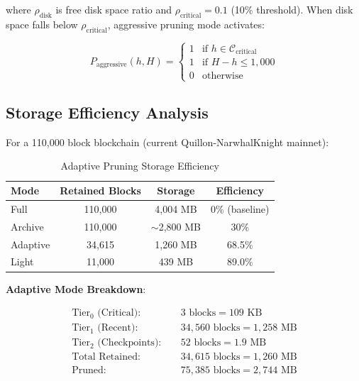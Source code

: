 \documentclass[11pt,a4paper]{article}
\begin{document}
where $\rho_{\text{disk}}$ is free disk space ratio and $\rho_{\text{critical}} = 0.1$ (10\% threshold). When disk space falls below $\rho_{\text{critical}}$, aggressive pruning mode activates:

\begin{equation}
P_{\text{aggressive}}(h, H) = \begin{cases}
1 & \text{if } h \in \mathcal{C}_{\text{critical}} \\
1 & \text{if } H - h \leq 1,000 \\
0 & \text{otherwise}
\end{cases}
\end{equation}

\subsection{Storage Efficiency Analysis}

For a 110,000 block blockchain (current Quillon-NarwhalKnight mainnet):

\begin{table}[H]
\centering
\caption{Adaptive Pruning Storage Efficiency}
\begin{tabular}{|l|c|c|c|}
\hline
\textbf{Mode} & \textbf{Retained Blocks} & \textbf{Storage} & \textbf{Efficiency} \\
\hline
Full & 110,000 & 4,004 MB & 0\% (baseline) \\
Archive & 110,000 & $\sim$2,800 MB & 30\% \\
Adaptive & 34,615 & 1,260 MB & 68.5\% \\
Light & 11,000 & 439 MB & 89.0\% \\
\hline
\end{tabular}
\label{tab:pruning-efficiency}
\end{table}

\textbf{Adaptive Mode Breakdown}:

\begin{align}
\text{Tier}_0 \text{ (Critical)}: & \quad 3 \text{ blocks} = 109 \text{ KB} \\
\text{Tier}_1 \text{ (Recent)}: & \quad 34,560 \text{ blocks} = 1,258 \text{ MB} \\
\text{Tier}_2 \text{ (Checkpoints)}: & \quad 52 \text{ blocks} = 1.9 \text{ MB} \\
\hline
\text{Total Retained}: & \quad 34,615 \text{ blocks} = 1,260 \text{ MB} \\
\text{Pruned}: & \quad 75,385 \text{ blocks} = 2,744 \text{ MB}
\end{align}
\end{document}
